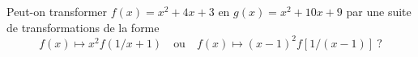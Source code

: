 Peut-on transformer $f(x) = x^2 + 4x + 3$ en $g(x) = x^2 + 10x + 9$ par une suite de transformations de la forme
\[ f(x) \mapsto x^2f(1/x + 1) \quad\text{ou}\quad f(x) \mapsto (x - 1)^2f[1/(x - 1)]\ ? \]

